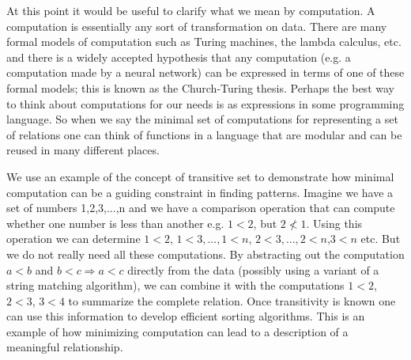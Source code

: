 \documentclass[doc]{apa}%
\begin{document}
At this point it would be useful to clarify what we mean by
computation.  A computation is essentially any sort of transformation
on data.   There are many formal models of computation such as Turing
machines, the lambda calculus, etc. and there is a widely accepted
hypothesis that any computation (e.g. a computation made by a neural
network) can be expressed in terms of one of these formal models; this
is known as the Church-Turing thesis.  Perhaps the best way to think
about computations for our needs is as expressions in some programming
language.  So when we say the minimal set of computations for
representing a set of relations one can think of functions in a
language that are modular and can be reused in many different places.

We use an example of the concept of transitive set to demonstrate how
minimal computation can be a guiding constraint in finding patterns.
Imagine we have a set of numbers {1,2,3,...,n} and we have a
comparison operation that can compute whether one number is less than
another e.g. $1<2$, but $2 \not< 1$.  Using this operation we can
determine $1<2$, $1<3,...,1<n$, $2<3,...,2<n$,$3<n$ etc.  But we do not really
need all these computations.  By abstracting out the computation $a<b$
and $b<c \Rightarrow a<c$ directly from the data (possibly using a variant of a
string matching algorithm), we can combine it with the computations
$1<2$, $2<3$, $3<4$ to summarize the complete relation.  Once transitivity
is known one can use this information to develop efficient sorting
algorithms.  This is an example of how minimizing computation can lead to a description of a meaningful relationship.   
\end{document}
